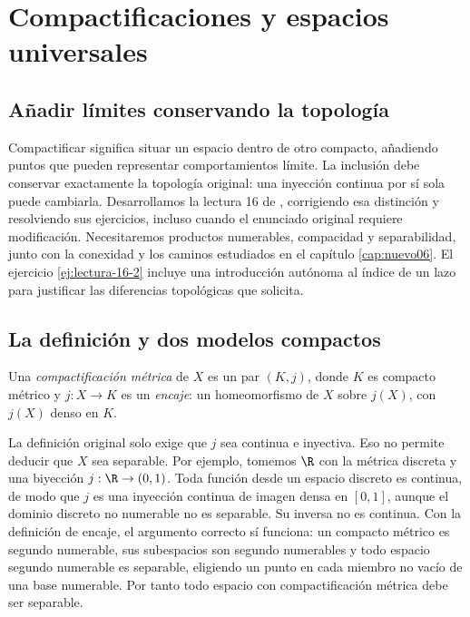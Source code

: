 \chapter{Compactificaciones y espacios universales}\label{cap:nuevo07}\label{chap:16}

\section{Añadir límites conservando la topología}\label{lectura:16}
Compactificar significa situar un espacio dentro de otro compacto, añadiendo puntos que pueden representar comportamientos límite. La inclusión debe conservar exactamente la topología original: una inyección continua por sí sola puede cambiarla. Desarrollamos la lectura 16 de \cite{valencia}, corrigiendo esa distinción y resolviendo sus ejercicios, incluso cuando el enunciado original requiere modificación. Necesitaremos productos numerables, compacidad y separabilidad, junto con la conexidad y los caminos estudiados en el capítulo \ref{cap:nuevo06}. El ejercicio \ref{ej:lectura-16-2} incluye una introducción autónoma al índice de un lazo para justificar las diferencias topológicas que solicita.

\section{La definición y dos modelos compactos}
\begin{definicion}
Una \emph{compactificación métrica} de $X$ es un par $(K,j)$, donde $K$ es compacto métrico y $j:X\to K$ es un \emph{encaje}: un homeomorfismo de $X$ sobre $j(X)$, con $j(X)$ denso en $K$.
\end{definicion}
\begin{observacion}
La definición original solo exige que $j$ sea continua e inyectiva. Eso no permite deducir que $X$ sea separable. Por ejemplo, tomemos $\R$ con la métrica discreta y una biyección $j:\R\to(0,1)$. Toda función desde un espacio discreto es continua, de modo que $j$ es una inyección continua de imagen densa en $[0,1]$, aunque el dominio discreto no numerable no es separable. Su inversa no es continua. Con la definición de encaje, el argumento correcto sí funciona: un compacto métrico es segundo numerable, sus subespacios son segundo numerables y todo espacio segundo numerable es separable, eligiendo un punto en cada miembro no vacío de una base numerable. Por tanto todo espacio con compactificación métrica debe ser separable.
\end{observacion}

